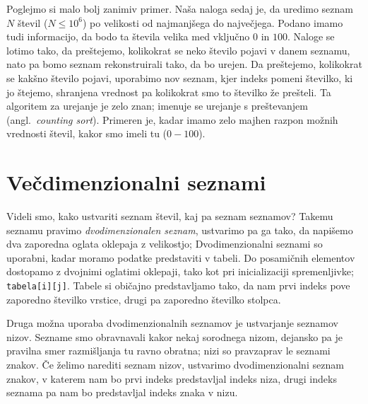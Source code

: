 \begin{examples}
  Poglejmo si malo bolj zanimiv primer.
  Naša naloga sedaj je, da uredimo seznam $N$ števil ($N \le 10^6$) po velikosti
  od najmanjšega do največjega.
  Podano imamo tudi informacijo, da bodo ta števila velika med vključno $0$ in
  $100$.
  Naloge se lotimo tako, da preštejemo, kolikokrat se neko število pojavi v
  danem seznamu, nato pa bomo seznam rekonstruirali tako, da bo urejen.
  Da preštejemo, kolikokrat se kakšno število pojavi, uporabimo nov seznam, kjer
  indeks pomeni številko, ki jo štejemo, shranjena vrednost pa kolikokrat smo to
  številko že prešteli.
  Ta algoritem za urejanje je zelo znan; imenuje se urejanje s preštevanjem
  (angl.~\textit{counting sort}).
  Primeren je, kadar imamo zelo majhen razpon možnih vrednosti števil, kakor smo
  imeli tu ($0 - 100$).
\end{examples}

\section{Večdimenzionalni seznami}

Videli smo, kako ustvariti seznam števil, kaj pa seznam seznamov?
Takemu seznamu pravimo \textit{dvodimenzionalen seznam}, ustvarimo pa ga tako,
da napišemo dva zaporedna oglata oklepaja z velikostjo;
Dvodimenzionalni seznami so uporabni, kadar moramo podatke predstaviti v tabeli.
Do posamičnih elementov dostopamo z dvojnimi oglatimi oklepaji, tako kot pri
inicializaciji spremenljivke; \verb+tabela[i][j]+.
Tabele si običajno predstavljamo tako, da nam prvi indeks pove zaporedno
številko vrstice, drugi pa zaporedno številko stolpca.

Druga možna uporaba dvodimenzionalnih seznamov je ustvarjanje seznamov nizov.
Sezname smo obravnavali kakor nekaj sorodnega nizom, dejansko pa je pravilna
smer razmišljanja tu ravno obratna; nizi so pravzaprav le seznami znakov.
Če želimo narediti seznam nizov, ustvarimo dvodimenzionalni seznam znakov, v
katerem nam bo prvi indeks predstavljal indeks niza, drugi indeks seznama pa nam
bo predstavljal indeks znaka v nizu.

